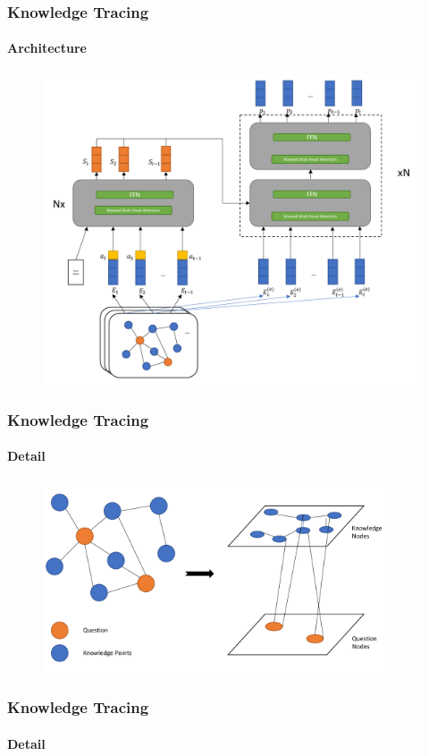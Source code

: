 \documentclass{beamer}
\begin{document}
\begin{frame}
  \frametitle{Knowledge Tracing}
  \framesubtitle{Architecture}
  \begin{figure}
    \includegraphics[height=0.8\textheight]{figures/ch3-overview.pdf}
  \end{figure}
\end{frame}

\begin{frame}
  \frametitle{Knowledge Tracing}
  \framesubtitle{Detail}
  \begin{figure}
    \includegraphics[width=0.9\textwidth]{figures/ch3-gat-kq.pdf}
  \end{figure}
\end{frame}

\begin{frame}
  \frametitle{Knowledge Tracing}
  \framesubtitle{Detail}

\end{frame}
\end{document}
